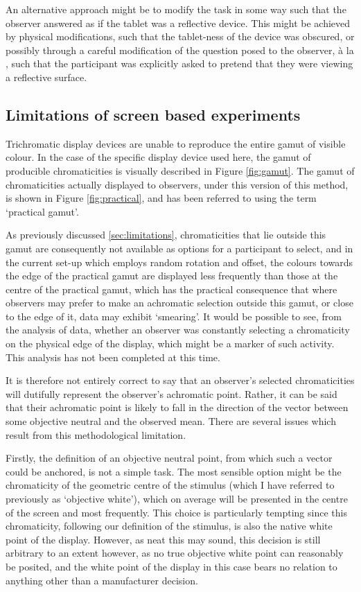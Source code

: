 An alternative approach might be to modify the task in some way such that the observer answered as if the tablet was a reflective device. This might be achieved by physical modifications, such that the tablet-ness of the device was obscured, or possibly through a careful modification of the question posed to the observer, à la \citet{arend_simultaneous_1986}, such that the participant was explicitly asked to pretend that they were viewing a reflective surface.

\subsection{Limitations of screen based experiments} \label{sec:bounding}

Trichromatic display devices are unable to reproduce the entire gamut of visible colour. In the case of the specific display device used here, the gamut of producible chromaticities is visually described in Figure \ref{fig:gamut}. The gamut of chromaticities actually displayed to observers, under this version of this method, is shown in Figure \ref{fig:practical}, and has been referred to using the term `practical gamut'.

As previously discussed \ref{sec:limitations}, chromaticities that lie outside this gamut are consequently not available as options for a participant to select, and in the current set-up which employs random rotation and offset, the colours towards the edge of the practical gamut are displayed less frequently than those at the centre of the practical gamut, which has the practical consequence that where observers may prefer to make an achromatic selection outside this gamut, or close to the edge of it, data may exhibit `smearing'. It would be possible to see, from the analysis of data, whether an observer was constantly selecting a chromaticity on the physical edge of the display, which might be a marker of such activity. This analysis has not been completed at this time.

It is therefore not entirely correct to say that an observer's selected chromaticities will dutifully represent the observer's achromatic point. Rather, it can be said that their achromatic point is likely to fall in the direction of the vector between some objective neutral and the observed mean. There are several issues which result from this methodological limitation.

Firstly, the definition of an objective neutral point, from which such a vector could be anchored, is not a simple task. The most sensible option might be the chromaticity of the geometric centre of the stimulus (which I have referred to previously as `objective white'), which on average will be presented in the centre of the screen and most frequently. This choice is particularly tempting since this chromaticity, following our definition of the stimulus, is also the native white point of the display. However, as neat this may sound, this decision is still arbitrary to an extent however, as no true objective white point can reasonably be posited, and the white point of the display in this case bears no relation to anything other than a manufacturer decision. 

